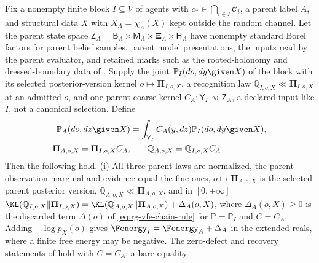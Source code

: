 \label{eq:rg-pointwise-parent-overlap}
\label{eq:rg-pointwise-parent-space}
\label{eq:rg-pointwise-parent-channel}
\label{eq:rg-pointwise-parent-kl-chain}
\label{eq:rg-pointwise-parent-defect}
\label{eq:rg-pointwise-parent-evaluator}
\label{eq:rg-pointwise-parent-evaluator-compatibility}
\label{eq:rg-pointwise-parent-recognition-marginals}
\label{eq:rg-pointwise-parent-prior-marginals}
\label{eq:rg-pointwise-parent-posterior-marginals}
Fix a nonempty finite block $I\subseteq V$ of agents with $c_*\in\bigcap_{i\in I}\mathcal C_i$, a
parent label $A$, and structural data $X$ with $X_A=\chi_A(X)$ kept outside the random channel. Let
the parent state space
$\mathsf Z_A=\mathsf B_A\times\mathsf M_A\times\boldsymbol\Xi_A\times\mathsf H_A$ have nonempty
standard Borel factors for parent belief samples, parent model presentations, the inputs read by
the parent evaluator, and retained marks such as the rooted-holonomy and dressed-boundary data of
. Supply the joint $\mathbb P_I(do,dy\given X)$ of the block with
its selected posterior-version kernel $o\mapsto\boldsymbol\Pi_{I,o,X}$, a recognition law
$\mathbb Q_{I,o,X}\ll\boldsymbol\Pi_{I,o,X}$ at an admitted $o$, and one parent coarse kernel
$C_A:\mathsf Y_I\rightsquigarrow\mathsf Z_A$, a declared input like $I$, not a canonical selection.
Define
\begin{align}
\mathbb P_A(do,dz\given X)&=\int_{\mathsf Y_I}C_A(y,dz)\mathbb P_I(do,dy\given X),
\label{eq:rg-pointwise-parent-generative}\\
\boldsymbol\Pi_{A,o,X}=\boldsymbol\Pi_{I,o,X}C_A,&\qquad
\mathbb Q_{A,o,X}=\mathbb Q_{I,o,X}C_A.
\label{eq:rg-pointwise-parent-triple}
\end{align}
Then the following hold. (i) All three parent laws are normalized, the parent observation marginal
and evidence equal the fine ones, $o\mapsto\boldsymbol\Pi_{A,o,X}$ is the selected parent posterior
version, $\mathbb Q_{A,o,X}\ll\boldsymbol\Pi_{A,o,X}$, and in $[0,+\infty]$
$\KL(\mathbb Q_{I,o,X}\Vert\boldsymbol\Pi_{I,o,X})
=\KL(\mathbb Q_{A,o,X}\Vert\boldsymbol\Pi_{A,o,X})+\Delta_A(o,X)$, where $\Delta_A(o,X)\geq0$ is
the discarded term $\Delta(o)$ of \eqref{eq:rg-vfe-chain-rule} for
$\mathbb P=\mathbb P_I$ and $C=C_A$. Adding $-\log p_X(o)$ gives $\Fenergy_I=\Fenergy_A+\Delta_A$ in
the extended reals, where a finite free energy may be negative. The zero-defect and recovery
statements of  hold with $C=C_A$; a bare equality
